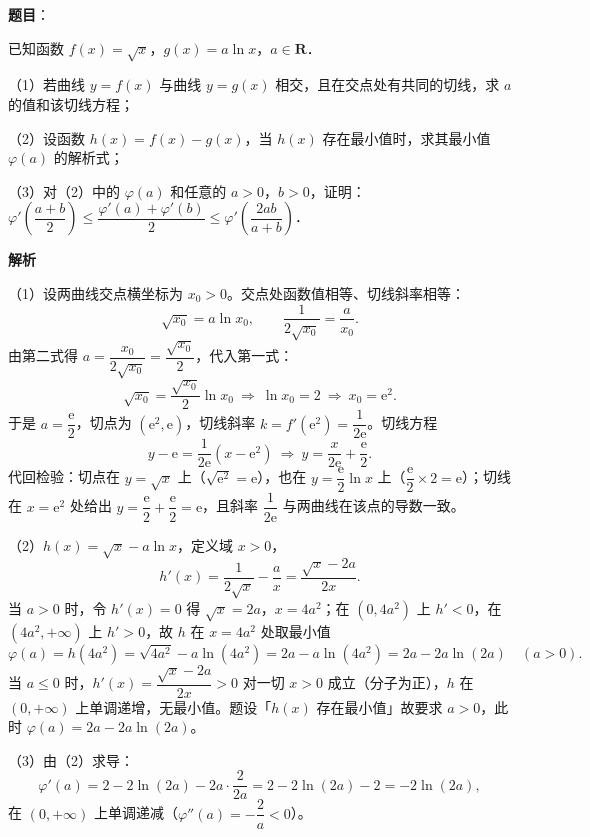 \begin{answer}

\textbf{题目}：

已知函数 $f(x)=\sqrt x$，$g(x)=a\ln x$，$a\in\mathbf R$．

（1）若曲线 $y=f(x)$ 与曲线 $y=g(x)$ 相交，且在交点处有共同的切线，求 $a$ 的值和该切线方程；

（2）设函数 $h(x)=f(x)-g(x)$，当 $h(x)$ 存在最小值时，求其最小值 $\varphi(a)$ 的解析式；

（3）对（2）中的 $\varphi(a)$ 和任意的 $a>0$，$b>0$，证明：$\varphi'\left(\dfrac{a+b}{2}\right)\leqslant\dfrac{\varphi'(a)+\varphi'(b)}{2}\leqslant\varphi'\left(\dfrac{2ab}{a+b}\right)$．

\textbf{解析}

（1）设两曲线交点横坐标为 $x_0>0$。交点处函数值相等、切线斜率相等：
\nopagebreak[4]
\[\sqrt{x_0}=a\ln x_0,\qquad \frac{1}{2\sqrt{x_0}}=\frac{a}{x_0}.\]
由第二式得 $a=\dfrac{x_0}{2\sqrt{x_0}}=\dfrac{\sqrt{x_0}}{2}$，代入第一式：
\nopagebreak[4]
\[\sqrt{x_0}=\frac{\sqrt{x_0}}{2}\ln x_0\ \Longrightarrow\ \ln x_0=2\ \Longrightarrow\ x_0=\mathrm e^2.\]
于是 $a=\dfrac{\mathrm e}{2}$，切点为 $(\mathrm e^2,\mathrm e)$，切线斜率 $k=f'(\mathrm e^2)=\dfrac{1}{2\mathrm e}$。切线方程
\nopagebreak[4]
\[y-\mathrm e=\frac{1}{2\mathrm e}(x-\mathrm e^2)\ \Longrightarrow\ y=\frac{x}{2\mathrm e}+\frac{\mathrm e}{2}.\]
代回检验：切点在 $y=\sqrt x$ 上（$\sqrt{\mathrm e^2}=\mathrm e$），也在 $y=\dfrac{\mathrm e}{2}\ln x$ 上（$\dfrac{\mathrm e}{2}\times 2=\mathrm e$）；切线在 $x=\mathrm e^2$ 处给出 $y=\dfrac{\mathrm e}{2}+\dfrac{\mathrm e}{2}=\mathrm e$，且斜率 $\dfrac{1}{2\mathrm e}$ 与两曲线在该点的导数一致。

（2）$h(x)=\sqrt x-a\ln x$，定义域 $x>0$，
\nopagebreak[4]
\[h'(x)=\frac{1}{2\sqrt x}-\frac ax=\frac{\sqrt x-2a}{2x}.\]
当 $a>0$ 时，令 $h'(x)=0$ 得 $\sqrt x=2a$，$x=4a^2$；在 $(0,4a^2)$ 上 $h'<0$，在 $(4a^2,+\infty)$ 上 $h'>0$，故 $h$ 在 $x=4a^2$ 处取最小值
\nopagebreak[4]
\[\varphi(a)=h(4a^2)=\sqrt{4a^2}-a\ln(4a^2)=2a-a\ln(4a^2)=2a-2a\ln(2a)\quad(a>0).\]
当 $a\leqslant 0$ 时，$h'(x)=\dfrac{\sqrt x-2a}{2x}>0$ 对一切 $x>0$ 成立（分子为正），$h$ 在 $(0,+\infty)$ 上单调递增，无最小值。题设「$h(x)$ 存在最小值」故要求 $a>0$，此时 $\varphi(a)=2a-2a\ln(2a)$。

（3）由（2）求导：
\nopagebreak[4]
\[\varphi'(a)=2-2\ln(2a)-2a\cdot\frac{2}{2a}=2-2\ln(2a)-2=-2\ln(2a),\]
在 $(0,+\infty)$ 上单调递减（$\varphi''(a)=-\dfrac2a<0$）。


\end{answer}
